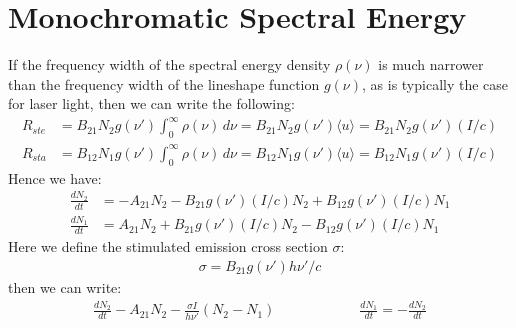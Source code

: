 \documentclass[11pt]{book}
\theoremstyle{break}
\theoremstyle{break}
\begin{document}
\section[Rate Equation for Monochromatic Light]{\color{red}Monochromatic Spectral Energy\color{black}}
If the frequency width of the spectral energy density $\rho(\nu)$ is much narrower than the frequency width of the lineshape function $g(\nu)$, as is typically the case for laser light, then we can write the following:
\begin{align*}
R_{ste} &= B_{21}N_2 g(\nu')\int_0^\infty \rho (\nu) \, d\nu = B_{21}N_2 g(\nu')\langle u\rangle = B_{21}N_2 g(\nu') (I/c)\\
R_{sta} &= B_{12}N_1 g(\nu') \int_0^\infty \rho(\nu) \, d\nu = B_{12}N_1 g(\nu')\langle u \rangle = B_{12}N_1 g(\nu')(I/c)
\end{align*}
Hence we have:
\begin{align*}
\frac{dN_2}{dt} &= -A_{21}N_2 - B_{21}g(\nu') (I/c) N_2 + B_{12}g(\nu') (I/c) N_1\\
\frac{dN_1}{dt} &= A_{21}N_2 + B_{21}g(\nu') (I/c) N_2 - B_{12}g(\nu') (I/c) N_1
\end{align*}
Here we define the stimulated emission cross section $\sigma$:
\begin{align*}
\sigma = B_{21}g(\nu')h\nu'/c
\end{align*}
then we can write:
\begin{align*}
\frac{dN_2}{dt} - A_{21}N_2 - \frac{\sigma I}{h\nu'}(N_2 - N_1) \qquad\qquad\qquad \frac{dN_1}{dt} = -\frac{dN_2}{dt}
\end{align*}
\end{document}
